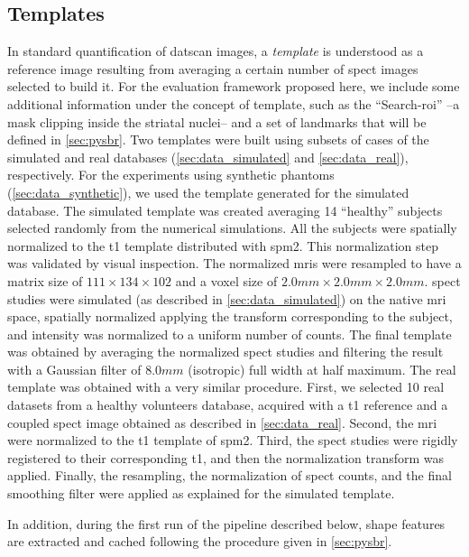 \documentclass{frontiers}
\newcommand{\cbstart}{\relax}
\newcommand{\cbend}{\relax}
\begin{document}
\subsection{Templates} %
\label{sec:data_templates}
\cbstart
In standard quantification of \gls*{datscan} images, a \emph{template} is understood as
  a reference image resulting from averaging a certain number of \gls*{spect}
  images selected to build it.
For the evaluation framework proposed here, we include some additional information
  under the concept of template, such as the ``Search-\gls*{roi}'' --a mask clipping inside
  the striatal nuclei-- and a set of landmarks that will be defined in \autoref{sec:pysbr}.
\cbend
Two templates were built using subsets of cases of the simulated and real
  databases (\autoref{sec:data_simulated} and \autoref{sec:data_real}), respectively.
For the experiments using synthetic phantoms (\autoref{sec:data_synthetic}),
  we used the template generated for the simulated database.
The simulated template was created averaging 14 ``healthy'' subjects selected randomly from
  the numerical simulations.
All the subjects were spatially normalized to the \gls*{t1} template distributed with
  \gls*{spm}2.
This normalization step was validated by visual inspection.
The normalized \glspl*{mri} were resampled to have a matrix size of
  $111\times134\times102$ and a voxel size of $2.0mm\times2.0mm\times2.0mm$.
\Gls*{spect} studies were simulated (as described in \autoref{sec:data_simulated})
  on the native \gls*{mri} space, spatially normalized applying the transform
  corresponding to the subject, and intensity was normalized to a
  uniform number of counts.
The final template was obtained by averaging the normalized \gls*{spect} studies
  and filtering the result with a Gaussian filter of $8.0mm$ (isotropic)
  full width at half maximum.
The real template was obtained with a very similar procedure. 
First, we selected 10 real datasets from a healthy volunteers database, acquired
  with a \gls*{t1} reference and a coupled \gls*{spect} image obtained as
  described in \autoref{sec:data_real}.
Second, the \gls*{mri} were normalized to the \gls*{t1} template of \gls*{spm}2.
Third, the \gls*{spect} studies were rigidly registered to their corresponding \gls*{t1}, 
  and then the normalization transform was applied.
Finally, the resampling, the normalization of \gls*{spect} counts, and the final
  smoothing filter were applied as explained for the simulated template.

\cbstart
In addition, during the first run of the pipeline described below, shape features 
  are extracted and cached following the procedure given in \autoref{sec:pysbr}.
\end{document}

